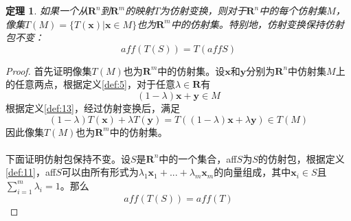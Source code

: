 \documentclass[a4paper,11pt,oneside]{article}
\newtheorem{theorem}{定理}[section]
\newtheorem{proof}{证明}[section]
\begin{document}
			\begin{theorem}
				如果一个从$\textbf{R}^{n}$到$\textbf{R}^{m}$的映射$T$为仿射变换，则对于$\textbf{R}^{n}$中的每个仿射集$M$，像集$T(M)=\{T(\textbf{x})|\textbf{x}\in M\}$也为$\textbf{R}^{m}$中的仿射集。特别地，仿射变换保持仿射包不变：
				$$aff(T(S))=T(affS)$$
			\end{theorem}
			\begin{proof}
				首先证明像集$T(M)$也为$\textbf{R}^{m}$中的仿射集。设$\textbf{x}$和$\textbf{y}$分别为$\textbf{R}^{n}$中仿射集$M$上的任意两点，根据定义\ref{def:5}，对于任意$\lambda \in \textbf{R}$有
				$$(1-\lambda)\textbf{x}+\textbf{y}\in M$$
				根据定义\ref{def:13}，经过仿射变换后，满足
				$$(1-\lambda)T(\textbf{x})+\lambda T(\textbf{y})=T((1-\lambda)\textbf{x}+\lambda \textbf{y})\in T(M)$$
				因此像集$T(M)$也为$\textbf{R}^{m}$中的仿射集。\\
				\\
				下面证明仿射包保持不变。设$S$是$\textbf{R}^{n}$中的一个集合，aff$S$为$S$的仿射包，根据定义\ref{def:11}，aff$S$可以由所有形式为$\lambda_{1}\textbf{x}_{1}+...+\lambda_{m}\textbf{x}_{m}$的向量组成，其中$\textbf{x}_{i}\in S$且$\sum_{i=1}^{m}\lambda_{i}=1$。那么
				$$aff(T(S))=aff(T)$$
			\end{proof}
\end{document}
